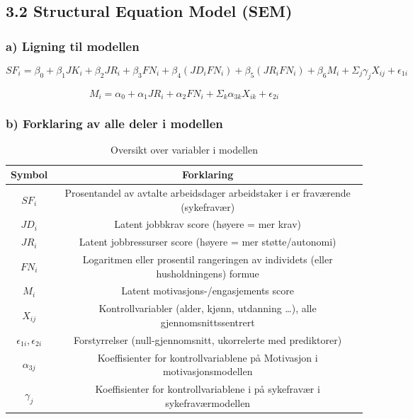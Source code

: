 \documentclass[
  12pt,
  a4paper,
  DIV=11,
  numbers=noendperiod]{scrartcl}
\begin{document}
\subsection{3.2 Structural Equation Model
(SEM)}\label{structural-equation-model-sem}

\subsubsection{a) Ligning til modellen}\label{a-ligning-til-modellen}

\[
SF_i = \beta_0 + \beta_1 JK_i + \beta_2 JR_i + \beta_3 FN_i + \beta_4 (JD_iFN_i) + \beta_5 (JR_i FN_i) + \beta_6 M_i + \Sigma_j \gamma_{j}X_{ij} + \epsilon_{1i}
\]

\[
M_i = \alpha_0 + \alpha_1 JR_i + \alpha_2 FN_i + \Sigma_k \alpha_{3k}X_{ik} + \epsilon_{2i}
\]

\subsubsection{b) Forklaring av alle deler i
modellen}\label{b-forklaring-av-alle-deler-i-modellen}

\begin{table}[H]
\centering
\begin{tabular}{|c|c|}
\hline
Symbol & Forklaring \\ 
\hline
$SF_i$ & Prosentandel av avtalte arbeidsdager arbeidstaker i er fraværende (sykefravær) \\
\hline
$JD_i$ & Latent jobbkrav score (høyere = mer krav) \\
\hline
$JR_i$ & Latent jobbressurser score (høyere = mer støtte/autonomi) \\
\hline
$FN_i$ & Logaritmen eller prosentil rangeringen av individets (eller husholdningens) formue \\
\hline
$M_i$ & Latent motivasjons-/engasjements score \\
\hline
$X_{ij}$ & Kontrollvariabler (alder, kjønn, utdanning …), alle gjennomsnittssentrert \\
\hline
$\epsilon_{1i}, \epsilon_{2i}$ & Forstyrrelser (null-gjennomsnitt, ukorrelerte med prediktorer) \\  
\hline
$\alpha_{3j} $ & Koeffisienter for kontrollvariablene på Motivasjon i motivasjonsmodellen \\
\hline
$\gamma_{j} $ & Koeffisienter for kontrollvariablene i på sykefravær i sykefraværmodellen \\
\hline
\end{tabular}
\caption{Oversikt over variabler i modellen}
\label{tab:variabler}
\end{table}
\end{document}
